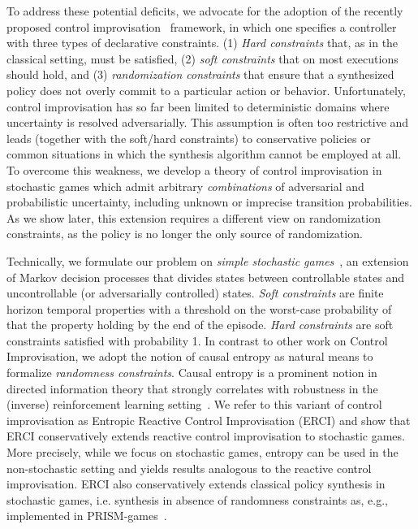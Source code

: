 To address these potential deficits, we advocate for the adoption of
the recently proposed control
improvisation~\cite{DBLP:conf/cav/FremontS18,DBLP:conf/fsttcs/FremontDSW15}
framework, in which one specifies a controller with three types of
declarative constraints. (1) \emph{Hard constraints} that, as in the
classical setting, must be satisfied, (2) \emph{soft constraints} that
on most executions should hold, and (3) \emph{randomization
constraints} that ensure that a synthesized policy does not overly
commit to a particular action or behavior. Unfortunately, control
improvisation has so far been limited to deterministic domains where
uncertainty is resolved adversarially. This assumption is often too
restrictive and leads (together with the soft/hard constraints) to
conservative policies or common situations in which the synthesis
algorithm cannot be employed at all. To overcome this weakness, we
develop a theory of control improvisation in stochastic games which
admit arbitrary \emph{combinations} of adversarial and probabilistic
uncertainty, including unknown or imprecise transition
probabilities. As we show later, this extension requires a different
view on randomization constraints, as the policy is no longer the only
source of randomization.

Technically, we formulate our problem on \emph{simple stochastic
games}~\cite{DBLP:conf/dimacs/Condon90}, an extension of Markov decision processes that divides states
between controllable states and uncontrollable (or adversarially
controlled) states. \emph{Soft constraints} are finite horizon
temporal properties with a threshold on the worst-case probability of
that the property holding by the end of the episode. \emph{Hard
constraints} are soft constraints satisfied with probability 1. In
contrast to other work on Control Improvisation, we adopt the notion
of causal entropy as natural means to formalize \emph{randomness
constraints}.  Causal entropy is a prominent notion in directed
information theory that strongly correlates with robustness in the
(inverse) reinforcement learning setting~\cite{mceThesis,
maxEntAnswer}. We refer to this variant of control improvisation as
Entropic Reactive Control Improvisation (ERCI) and show that ERCI
conservatively extends reactive control improvisation to stochastic
games. More precisely, while we focus on stochastic games, entropy can
be used in the non-stochastic setting and yields results analogous to
the reactive control improvisation. ERCI also conservatively extends  classical policy synthesis in stochastic games, i.e. synthesis in absence of randomness constraints as, e.g., implemented in PRISM-games~\cite{DBLP:journals/sttt/KwiatkowskaPW18}.


